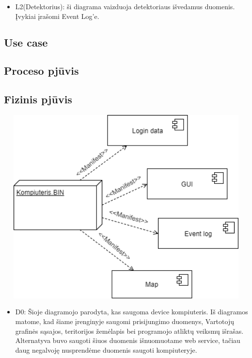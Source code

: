 ﻿\documentclass[oneside]{VUMIFPSkursinis}
\begin{document}
\begin{itemize}
		\item L2(Detektorius): ši diagrama vaizduoja detektoriaus išvedamus duomenis. Įvykiai įrašomi Event Log’e.
	\end{itemize}
\pagebreak
		

	
\subsection{Use case}
\subsection{Proceso pjūvis}
\subsection{Fizinis pjūvis}
	\includegraphics[width=15cm,height=10cm]{Deployment.png}
	\begin{itemize}
		\item D0: Šioje diagramojo parodyta, kas saugoma device kompiuteris. 
		Iš diagramos matome, kad šiame įrenginyje saugomi prisijungimo duomenys, Vartotojų grafinės sąsajos, teritorijos žemėlapis bei programojo atliktų veiksmų išrašas. Alternatyva buvo saugoti šiuos duomenis išnuomuotame web service, tačiau daug negalvoję nusprendėme duomenis saugoti kompiuteryje.
	\end{itemize}
\end{document}
